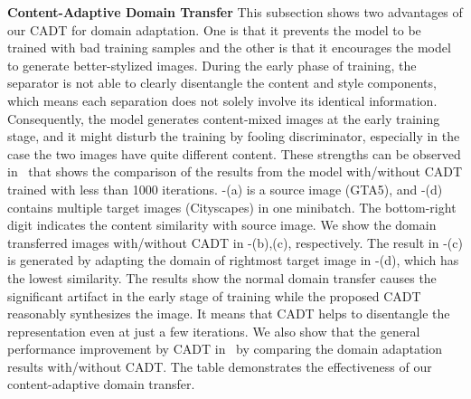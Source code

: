 \documentclass[final]{cvpr}
\begin{document}
\textbf{Content-Adaptive Domain Transfer} \quad
This subsection shows two advantages of our CADT for domain adaptation.
One is that it prevents the model to be trained with bad training samples and the other is that it encourages the model to generate better-stylized images.
During the early phase of training, the separator is not able to clearly disentangle the content and style components, which means each separation does not solely involve its identical information.
Consequently, the model generates content-mixed images at the early training stage, and it might disturb the training by fooling discriminator, especially in the case the two images have quite different content.
These strengths can be observed in~ that shows the comparison of the results from the model with/without CADT trained with less than 1000 iterations.
-(a) is a source image (GTA5), and -(d) contains multiple target images (Cityscapes) in one minibatch. The bottom-right digit indicates the content similarity with source image.
We show the domain transferred images with/without CADT in -(b),(c), respectively.
The result in -(c) is generated by adapting the domain of rightmost target image in -(d), which has the lowest similarity.
The results show the normal domain transfer causes the significant artifact in the early stage of training while the proposed CADT reasonably synthesizes the image.
It means that CADT helps to disentangle the representation even at just a few iterations.
We also show that the general performance improvement by CADT in~ by comparing the domain adaptation results with/without CADT.
The table demonstrates the effectiveness of our content-adaptive domain transfer.
\end{document}
